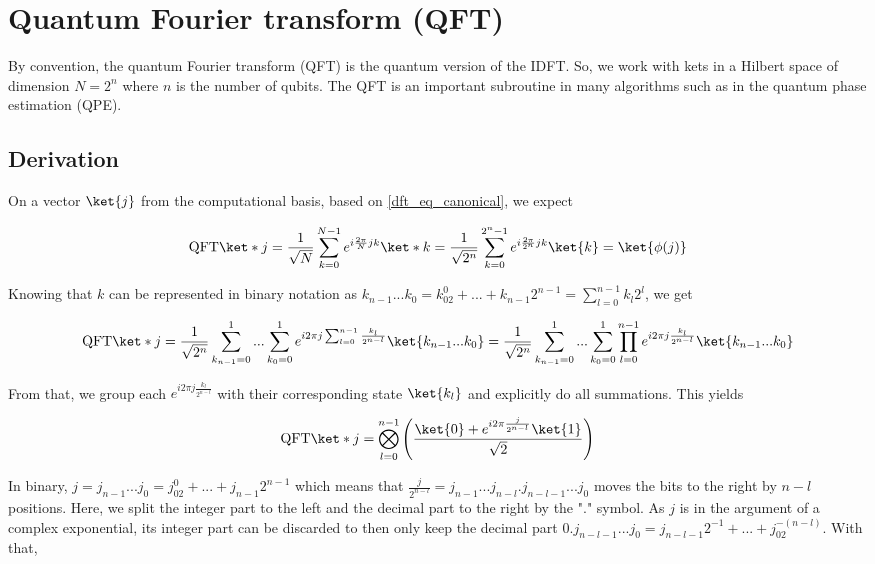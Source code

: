 \newpage
\section{Quantum Fourier transform (QFT)}
By convention, the quantum Fourier transform (QFT) is the quantum version of the IDFT. So, we work with kets in a Hilbert space of dimension $N = 2^n$ where $n$ is the number of qubits. The QFT is an important subroutine in many algorithms such as in the quantum phase estimation (QPE).

\subsection{Derivation}
On a vector $\ket{j}$ from the computational basis, based on \ref{dft_eq_canonical}, we expect

\begin{equation}
    \text{QFT}\ket*{j} = \frac{1}{\sqrt{N}}\sum_{k=0}^{N-1}e^{i \frac{2\pi}{N}jk}\ket*{k} = \frac{1}{\sqrt{2^n}}\sum_{k=0}^{2^n - 1}e^{i\frac{2\pi}{2^{n}}jk}\ket{k} = \ket{\phi(j)}
    \label{def_qft}
\end{equation}

Knowing that $k$ can be represented in binary notation as $k_{n-1}...k_0 = k_02^0 + ... + k_{n-1}2^{n-1} = \sum_{l=0}^{n-1}k_l 2^l$, we get

\begin{equation*}
    \text{QFT}\ket*{j} = \frac{1}{\sqrt{2^n}}\sum_{k_{n-1} = 0}^{1}...\sum_{k_0 = 0}^{1}e^{i 2\pi j \sum_{l=0}^{n-1}\frac{k_l}{2^{n-l}}}\ket{k_{n-1}...k_0} = \frac{1}{\sqrt{2^n}}\sum_{k_{n-1} = 0}^{1}...\sum_{k_0 = 0}^{1} \prod_{l=0}^{n-1} e^{i 2\pi j \frac{k_l}{2^{n-l}}}\ket{k_{n-1}...k_0}
\end{equation*}

From that, we group each $e^{i 2\pi j \frac{k_l}{2^{n-l}}}$ with their corresponding state $\ket{k_l}$ and explicitly do all summations. This yields 

\begin{equation*}
    \text{QFT}\ket*{j} = \bigotimes_{l=0}^{n-1}\left(\frac{\ket{0} + e^{i 2\pi \frac{j}{2^{n-l}}}\ket{1}}{\sqrt{2}}\right)
\end{equation*}

In binary, $j = j_{n-1}...j_0 = j_02^0 + ... + j_{n-1}2^{n-1}$ which means that $\frac{j}{2^{n-l}} = j_{n-1}...j_{n-l}\textbf{.}j_{n-l-1}...j_0$ moves the bits to the right by $n-l$ positions. Here, we split the integer part to the left and the decimal part to the right by the "$\textbf{.}$" symbol. As $j$ is in the argument of a complex exponential, its integer part can be discarded to then only keep the decimal part $0\textbf{.}j_{n-l-1}...j_0 = j_{n-l-1}2^{-1} + ... + j_02^{-(n-l)}$. With that,

